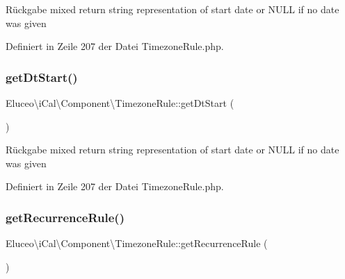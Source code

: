 \begin{DoxyReturn}{Rückgabe}
mixed return string representation of start date or N\+U\+LL if no date was given 
\end{DoxyReturn}


Definiert in Zeile 207 der Datei Timezone\+Rule.\+php.

\mbox{\label{class_eluceo_1_1i_cal_1_1_component_1_1_timezone_rule_a1a574efdf94fc99192e26aa965293adb}} 
\subsubsection{\texorpdfstring{get\+Dt\+Start()}{getDtStart()}\hspace{0.1cm}{\footnotesize\ttfamily [3/3]}}
{\footnotesize\ttfamily Eluceo\textbackslash{}i\+Cal\textbackslash{}\+Component\textbackslash{}\+Timezone\+Rule\+::get\+Dt\+Start (\begin{DoxyParamCaption}{ }\end{DoxyParamCaption})}

\begin{DoxyReturn}{Rückgabe}
mixed return string representation of start date or N\+U\+LL if no date was given 
\end{DoxyReturn}


Definiert in Zeile 207 der Datei Timezone\+Rule.\+php.

\mbox{\label{class_eluceo_1_1i_cal_1_1_component_1_1_timezone_rule_aa0a37d70f8cd2741dca701b150ecb4eb}} 
\subsubsection{\texorpdfstring{get\+Recurrence\+Rule()}{getRecurrenceRule()}\hspace{0.1cm}{\footnotesize\ttfamily [1/3]}}
{\footnotesize\ttfamily Eluceo\textbackslash{}i\+Cal\textbackslash{}\+Component\textbackslash{}\+Timezone\+Rule\+::get\+Recurrence\+Rule (\begin{DoxyParamCaption}{ }\end{DoxyParamCaption})}

